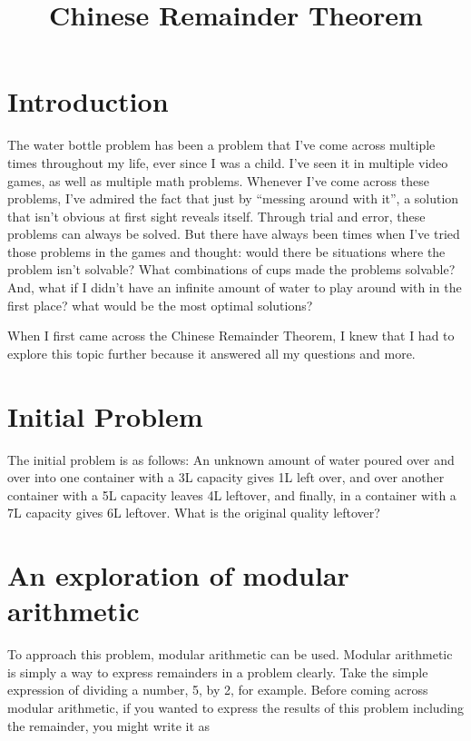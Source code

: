 \documentclass[index]{subfiles}
\begin{document}
\title{Chinese Remainder Theorem}
\date{}
\author{}
\maketitle

\newpage

\tableofcontents
\thispagestyle{empty}
\newpage
\setcounter{page}{1}

\section{Introduction}

The water bottle problem has been a problem that I've come across multiple times throughout my life, ever since I was a child. I've seen it in multiple video games, as well as multiple math problems. Whenever I've come across these problems, I've admired the fact that just by ``messing around with it'', a solution that isn't obvious at first sight reveals itself. Through trial and error, these problems can always be solved. But there have always been times when I've tried those problems in the games and thought: would there be situations where the problem isn't solvable? What combinations of cups made the problems solvable? And, what if I didn't have an infinite amount of water to play around with in the first place? what would be the most optimal solutions?

When I first came across the Chinese Remainder Theorem, I knew that I had to explore this topic further because it answered all my questions and more.

\section{Initial Problem}

The initial problem is as follows: An unknown amount of water poured over and over into one container with a 3L capacity gives 1L left over, and over another container with a 5L capacity leaves 4L leftover, and finally, in a container with a 7L capacity gives 6L leftover. What is the original quality leftover?


\section{An exploration of modular arithmetic}

To approach this problem, modular arithmetic can be used. Modular arithmetic is simply a way to express remainders in a problem clearly. Take the simple expression of dividing a number, 5, by 2, for example. Before coming across modular arithmetic, if you wanted to express the results of this problem including the remainder, you might write it as
\end{document}
